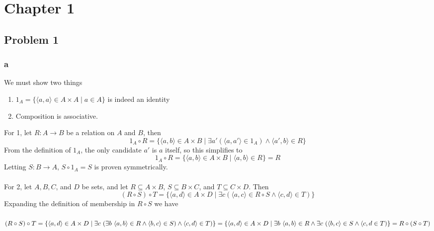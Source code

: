 \documentclass{article}
\begin{document}
\section{Chapter 1}

\subsection{Problem 1}

\subsubsection{a}

We must show two things
\begin{enumerate}
\item $1_A = \{ \langle a, a \rangle \in A \times A \mid a \in A \}$ is indeed an identity
\item Composition is associative.
\end{enumerate}
For 1, let $R : A \to B$ be a relation on $A$ and $B$, then 
$$1_A \circ R = \{ \langle a, b \rangle \in A \times B \mid \exists a' (\langle a, a' \rangle \in 1_A) \wedge \langle a', b \rangle \in R \}$$  
From the definition of $1_A$, the only candidate $a'$ is $a$ itself, so this simplifies to
$$1_A \circ R = \{ \langle a, b \rangle \in A \times B \mid \langle a, b \rangle \in R \} = R$$
Letting $S : B \to A$, $S \circ 1_A = S$ is proven symmetrically.\\~\\

For 2, let $A,B,C$, and $D$ be sets, and let $R \subseteq A \times B$, $S \subseteq B \times C$, and $T \subseteq C \times D$.
Then 
$$(R \circ S) \circ T = \{ \langle a,d \rangle \in A \times D \mid \exists c (\langle a,c \rangle \in R \circ S \wedge \langle c,d \rangle \in T) \}$$
Expanding the definition of membership in $R \circ S$ we have\\~\\
$(R \circ S) \circ T\\~\\ 
= \{ \langle a,d \rangle \in A \times D \mid \exists c~(\exists b~\langle a,b \rangle \in R \wedge \langle b, c \rangle \in S) \wedge \langle c,d \rangle \in T) \} \\~\\
= \{ \langle a,d \rangle \in A \times D \mid \exists b~\langle a, b \rangle \in R \wedge \exists c~(\langle b,c \rangle \in S \wedge \langle c, d \in T) \}\\~\\
= R \circ (S \circ T)$
\end{document}
